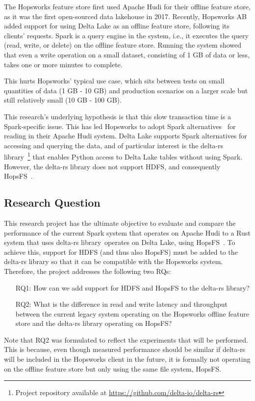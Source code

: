 The Hopsworks feature store \cite{10.1145/3626246.3653389} first used Apache Hudi for their offline feature store, as it was the first open-sourced data lakehouse in 2017. Recently, Hopsworks \gls{AB} added support for using Delta Lake as an offline feature store, following its clients' requests. Spark is a query engine in the system, i.e., it executes the query (read, write, or delete) on the offline feature store. Running the system showed that even a write operation on a small dataset, consisting of 1 GB of data or less, takes one or more minutes to complete.

This hurts Hopsworks' typical use case, which sits between tests on small quantities of data (1 GB - 10 GB) and production scenarios on a larger scale but still relatively small (10 GB - 100 GB).

This research's underlying hypothesis is that this slow transaction time is a Spark-specific issue. This has led Hopsworks to adopt Spark alternatives~\cite{Khazanchi1801362} for reading in their Apache Hudi system. Delta Lake supports Spark alternatives for accessing and querying the data, and of particular interest is the delta-rs library~\footnote{Project repository available at \url{https://github.com/delta-io/delta-rs}} that enables Python access to Delta Lake tables without using Spark. 
However, the delta-rs library does not support \gls{HDFS}, and consequently \gls{HopsFS}~\cite{niaziHopsFSScalingHierarchical2017}.

\subsection{Research Question}
\label{subsec:researchQuestion}
This research project has the ultimate objective to evaluate and compare the performance of the current Spark system that operates on Apache Hudi to a Rust system that uses delta-rs library~\footnotemark[\value{footnote}] operates on Delta Lake, using \gls{HopsFS}~\cite{niaziHopsFSScalingHierarchical2017}. To achieve this, support for \gls{HDFS} (and thus also \gls{HopsFS}) must be added to the delta-rs library so that it can be compatible with the Hopsworks system. Therefore, the project addresses the following two \glspl{RQ}:
\begin{enumerate}
    \item[RQ1:] How can we add support for \gls{HDFS} and \gls{HopsFS} to the delta-rs library?
    \item[RQ2:] What is the difference in read and write latency and throughput between the current legacy system operating on the Hopsworks offline feature store and the delta-rs library operating on HopsFS?
\end{enumerate}
Note that RQ2 was formulated to reflect the experiments that will be performed. This is because, even though measured performance should be similar if delta-rs will be included in the Hopsworks client in the future, it is formally not operating on the offline feature store but only using the same file system, \gls{HopsFS}.

